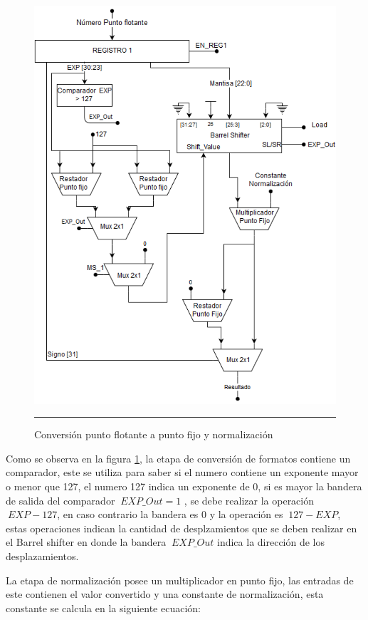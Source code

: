   \begin{figure}[H]
  \centering
    \includegraphics[scale=0.6]{./NORMALIZADOR.png}
    \rule{35em}{0.5pt}
  \caption[Normalizador]{Conversión punto flotante a punto fijo y normalización  }
  \label{fig:NORM}
\end{figure} 

Como se observa en la figura \ref{fig:NORM}, la etapa de conversión de formatos contiene un comparador, este se utiliza para saber si el numero contiene un exponente mayor o menor que 127, el numero 127 indica un exponente de 0, si es mayor la bandera de salida del comparador $\ EXP\_Out = 1$ , se debe realizar la operación $\ EXP - 127$, en caso contrario la bandera es 0 y la operación es $\ 127 - EXP$, estas operaciones indican la cantidad de desplzamientos que se deben realizar en el Barrel shifter en donde la bandera $\ EXP\_Out $ indica la dirección de los desplazamientos. 

La etapa de normalización posee un multiplicador en punto fijo, las entradas de este contienen el valor convertido y una constante de normalización, esta constante se calcula en la siguiente ecuación: 
      

